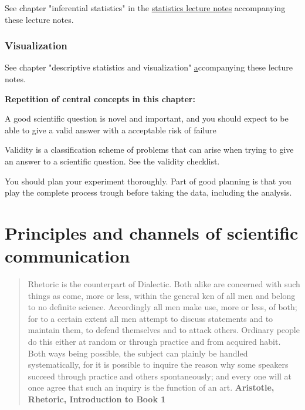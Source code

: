 \documentclass{tufte-book}
\begin{document}
See chapter "inferential statistics" in the \href{https://florianhartig.github.io/Statistics/}{statistics lecture notes} accompanying these lecture notes.


\subsection{Visualization}

See chapter "descriptive statistics and visualization" \href{https://florianhartig.github.io/Statistics/} accompanying these lecture notes.


\vspace{1cm}
\begin{mdframed}[backgroundcolor=black!10,rightline=false,leftline=false]

\textbf{Repetition of central concepts in this chapter:}

\begin{itemize*}
  \item A good scientific question is novel and important, and you should expect to be able to give a valid answer with a acceptable risk of failure
  \item Validity is a classification scheme of problems that can arise when trying to give an answer to a scientific question. See the validity checklist.
  \item You should plan your experiment thoroughly. Part of good planning is that you play the complete process trough before taking the data, including the analysis.
\end{itemize*}

\end{mdframed}


\chapter{Principles and channels of scientific communication}

\begin{quotation}
Rhetoric is the counterpart of Dialectic. Both alike are concerned with such things as come, more or less, within the general ken of all men and belong to no definite science. Accordingly all men make use, more or less, of both; for to a certain extent all men attempt to discuss statements and to maintain them, to defend themselves and to attack others. Ordinary people do this either at random or through practice and from acquired habit. Both ways being possible, the subject can plainly be handled systematically, for it is possible to inquire the reason why some speakers succeed through practice and others spontaneously; and every one will at once agree that such an inquiry is the function of an art.\textbf{ Aristotle, Rhetoric, Introduction to Book 1}
\end{quotation}
\end{document}
